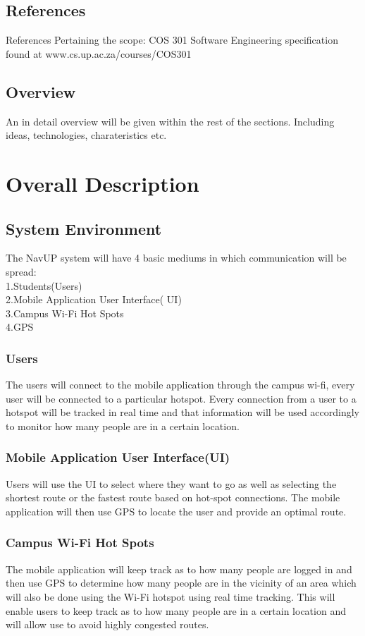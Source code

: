 \documentclass{article}
\begin{document}
\subsection{References}
References Pertaining the scope:
COS 301 Software Engineering specification found at www.cs.up.ac.za/courses/COS301
\subsection{Overview}
An in detail overview will be given within the rest of the sections. Including ideas, technologies, charateristics etc.
\newpage
\centering
\section{Overall Description}
\subsection{System Environment}
The NavUP system will have 4  basic mediums in which communication will be spread: \\ 1.Students(Users) \\ 2.Mobile Application User Interface( UI)\\ 3.Campus Wi-Fi Hot Spots \\ 4.GPS 
\subsubsection{Users}
The users will connect to the mobile application through the campus wi-fi, every user will be connected to a particular hotspot. Every connection from a user to a hotspot will be tracked in real time and that information will be used accordingly to monitor how many people are in a certain location.
\subsubsection {Mobile Application User Interface(UI)}
Users will use the UI to select where they want to go as well as selecting the shortest route or the fastest route based on hot-spot connections. The mobile application will then use GPS to locate the user and provide an optimal route.
\subsubsection {Campus Wi-Fi Hot Spots}
The mobile application will keep track as to how many people are logged in and then use GPS to determine how many people are in the vicinity of an area which will also be done using the Wi-Fi hotspot using real time tracking. This will enable users to keep track as to how many people are in a certain location and will allow use to avoid highly congested routes. 
\end{document}
